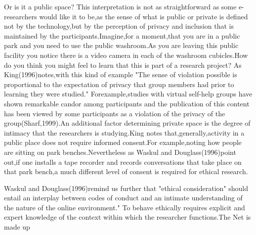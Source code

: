 \documentclass[10pt,a4paper]{book}
\begin{document}
Or is it a public space? This interpretation is not as straightforward as some e-researchers would like it to be,as the sense of what is public or private is defined not by the technology,but by the perception of privacy and inclusion that is maintained by the participants.Imagine,for a moment,that you are in a public park and you need to use the public washroom.As you are leaving this public facility you notice there is a video camera in each of the washroom cubicles.How do you think you might feel to learn that this is part of a research project? As King(1996)notes,with this kind of example "The sense of violation possible is proportional to the expectation of privacy that group members had prior to learning they were studied." Forexample,studies with virtual self-help groups have shown remarkable candor among participants and the publication of this content has been viewed by some participants as a violation of the privacy of the group(Sharf,1999).An additional factor determining private space is the degree of intimacy that the researchers is studying.King notes that,generally,activity in a public place does not require informed consent.For example,noting how people are sitting on park benches.Nevertheless as Waskul and Douglass(1996)point out,if one installs a tape recorder and records conversations that take place on that park bench,a much different level of consent is required for ethical research.

Waskul and Douglass(1996)remind us further that "ethical consideration" should entail an interplay between codes of conduct and an intimate understanding of the nature of the online environment." To behave ethically requires explicit and expert knowledge of the context within which the researcher functions.The Net is made up
\end{document}
